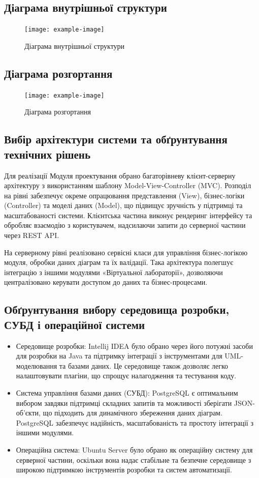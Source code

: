 \documentclass[oneside,14pt]{extarticle}
\begin{document}
\begin{normalsize}
	\subsection{Діаграма внутрішньої структури}
	\begin{figure}[H]
		\centering
		\texttt{[image: example-image]}
		\caption{Діаграма внутрішньої структури}
	\end{figure}
	
	\subsection{Діаграма розгортання}
	\begin{figure}[H]
		\centering
		\texttt{[image: example-image]}
		\caption{Діаграма розгортання}
	\end{figure}
	
	\subsection{Вибір архітектури системи та обґрунтування технічних рішень}
	Для реалізації Модуля проектування обрано багаторівневу клієнт-серверну архітектуру з використанням шаблону Model-View-Controller (MVC). Розподіл на рівні забезпечує окреме опрацювання представлення (View), бізнес-логіки (Controller) та моделі даних (Model), що підвищує зручність у підтримці та масштабованості системи. Клієнтська частина виконує рендеринг інтерфейсу та обробляє взаємодію з користувачем, надсилаючи запити до серверної частини через REST API.
	
	На серверному рівні реалізовано сервісні класи для управління бізнес-логікою модуля, обробки даних діаграм та їх валідації. Така архітектура полегшує інтеграцію з іншими модулями «Віртуальної лабораторії», дозволяючи централізовано керувати доступом до даних та бізнес-процесами.
	
	\subsection{Обґрунтування вибору середовища розробки, СУБД і операційної системи}
	\begin{itemize}
		\item Середовище розробки: Intellij IDEA було обрано через його потужні засоби для розробки на Java та підтримку інтеграції з інструментами для UML-моделювання та базами даних. Це середовище також дозволяє легко налаштовувати плагіни, що спрощує налагодження та тестування коду.
		\item Система управління базами даних (СУБД): PostgreSQL є оптимальним вибором завдяки підтримці складних запитів та можливості зберігати JSON-об'єкти, що підходить для динамічного збереження даних діаграм. PostgreSQL забезпечує надійність, масштабованість та простоту інтеграції з іншими модулями.
		\item Операційна система: Ubuntu Server було обрано як операційну систему для серверної частини, оскільки вона надає стабільне та безпечне середовище з широкою підтримкою інструментів розробки та систем автоматизації.
	\end{itemize}
	

\end{normalsize}
\end{document}
